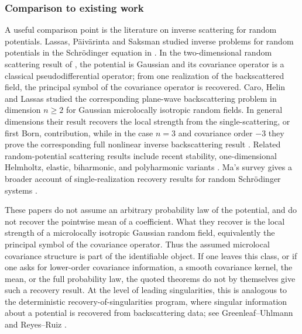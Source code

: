 \documentclass[11pt]{article}
\theoremstyle{plain}
\theoremstyle{definition}
\theoremstyle{remark}
\begin{document}
\subsubsection*{Comparison to existing work}



A useful comparison point is the literature on inverse scattering for random potentials.  Lassas, P\"aiv\"arinta and Saksman studied inverse problems for random potentials in the Schr\"odinger equation in \cite{LassasPaivarintaSaksman2004,LassasPaivarintaSaksman2008}.  In the two-dimensional random scattering result of \cite{LassasPaivarintaSaksman2008}, the potential is Gaussian and its covariance operator is a classical pseudodifferential operator; from one realization of the backscattered field, the principal symbol of the covariance operator is recovered.  Caro, Helin and Lassas studied the corresponding plane-wave backscattering problem in dimension $n\ge 2$ for Gaussian microlocally isotropic random fields.  In general dimensions their result recovers the local strength from the single-scattering, or first Born, contribution, while in the case $n=3$ and covariance order $-3$ they prove the corresponding full nonlinear inverse backscattering result \cite{CaroHelinLassas2016}.  Related random-potential scattering results include recent stability, one-dimensional Helmholtz, elastic, biharmonic, and polyharmonic variants \cite{WangXuZhao2025StabilityPotential,WangXuZhao2025OneDim,LiLiWang2022ElasticPotential,LiWang2024BiharmonicRandomPotential,LiLiWangYang2025PolyharmonicPotential}.  Ma's survey gives a broader account of single-realization recovery results for random Schr\"odinger systems \cite{Ma2021}.

These papers do not assume an arbitrary probability law of the potential, and do not recover the pointwise mean of a coefficient.  What they recover is the local strength of a microlocally isotropic Gaussian random field, equivalently the principal symbol of the covariance operator.  Thus the assumed microlocal covariance structure is part of the identifiable object.  If one leaves this class, or if one asks for lower-order covariance information, a smooth covariance kernel, the mean, or the full probability law, the quoted theorems do not by themselves give such a recovery result.  At the level of leading singularities, this is analogous to the deterministic recovery-of-singularities program, where singular information about a potential is recovered from backscattering data; see Greenleaf--Uhlmann \cite{GreenleafUhlmann1993} and Reyes--Ruiz \cite{ReyesRuiz2012}.
\end{document}
